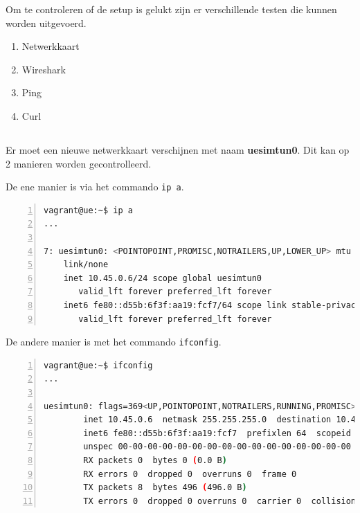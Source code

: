 Om te controleren of de setup is gelukt zijn er verschillende testen die kunnen worden uitgevoerd.

\begin{enumerate}
    \item Netwerkkaart
    \item Wireshark
    \item Ping
    \item Curl
\end{enumerate}

\subsection{}%
\label{sec:Test-NIC}%

Er moet een nieuwe netwerkkaart verschijnen met naam \textbf{uesimtun0}.
Dit kan op 2 manieren worden gecontrolleerd.

De ene manier is via het commando \lstinline!ip a!.
\begin{lstlisting}[basicstyle=\small, frame=single, breaklines=true, postbreak=\mbox{\textcolor{red}{$\hookrightarrow$}\space}, escapeinside ={\%,}, escapechar={!}, numbers=left, language=sh, caption=Test - ip a]
vagrant@ue:~$ ip a
... 

7: uesimtun0: <POINTOPOINT,PROMISC,NOTRAILERS,UP,LOWER_UP> mtu 1400 qdisc fq_codel state UNKNOWN group default qlen 500
    link/none
    inet 10.45.0.6/24 scope global uesimtun0
       valid_lft forever preferred_lft forever
    inet6 fe80::d55b:6f3f:aa19:fcf7/64 scope link stable-privacy
       valid_lft forever preferred_lft forever
\end{lstlisting}


De andere manier is met het commando \lstinline!ifconfig!.
\begin{lstlisting}[basicstyle=\small, frame=single, breaklines=true, postbreak=\mbox{\textcolor{red}{$\hookrightarrow$}\space}, escapeinside ={\%,}, escapechar={!}, numbers=left, language=sh, caption=Test - ifconfig]
vagrant@ue:~$ ifconfig
...

uesimtun0: flags=369<UP,POINTOPOINT,NOTRAILERS,RUNNING,PROMISC>  mtu 1400
        inet 10.45.0.6  netmask 255.255.255.0  destination 10.45.0.6
        inet6 fe80::d55b:6f3f:aa19:fcf7  prefixlen 64  scopeid 0x20<link>
        unspec 00-00-00-00-00-00-00-00-00-00-00-00-00-00-00-00  txqueuelen 500  (UNSPEC)
        RX packets 0  bytes 0 (0.0 B)
        RX errors 0  dropped 0  overruns 0  frame 0
        TX packets 8  bytes 496 (496.0 B)
        TX errors 0  dropped 0 overruns 0  carrier 0  collisions 0
\end{lstlisting}

